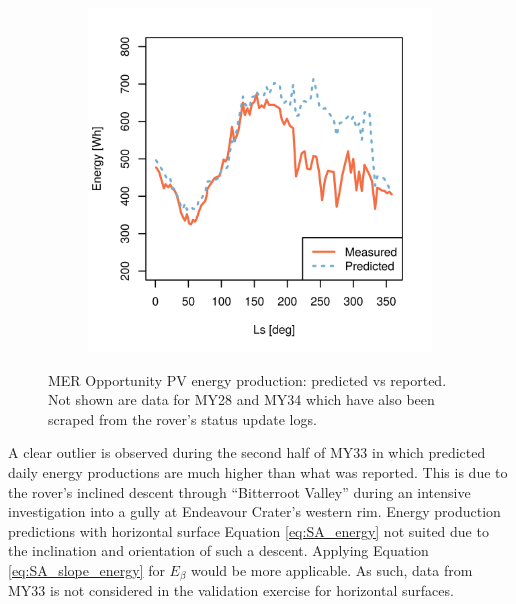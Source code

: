 \begin{figure}[h]
\begin{subfigure}[t]{\subfigureWidth}
  		\label{fig:plot:sub:mer-energy-production-predicted-vs-reported-my32}
  	\end{subfigure}\hfill
	   \begin{subfigure}[t]{\subfigureWidth}
      \centering
  		\includegraphics[height=\graphicsHeight]{sections/power-and-energy-predictions/plots/predicted-vs-measured-energy-my33.png}
  		\label{fig:plot:sub:mer-energy-production-predicted-vs-reported-my33}
	   \end{subfigure}\hfill
    \caption[MER Opportunity PV energy production: predicted vs reported]
            {MER Opportunity PV energy production: predicted vs reported. Not shown are data for MY28 and MY34 which have also been scraped from the rover's status update logs.}
	\label{fig:plot:mer-energy-production-predicted-vs-reported}
\vspace{-2ex}
\end{figure}

\clearpage

A clear outlier is observed during the second half of MY33 in which predicted daily energy productions are much higher than what was reported. This is due to the rover's inclined descent through ``Bitterroot Valley'' during an intensive investigation into a gully at Endeavour Crater's western rim. Energy production predictions with horizontal surface Equation \ref{eq:SA_energy} not suited due to the inclination and orientation of such a descent. Applying Equation \ref{eq:SA_slope_energy} for $E_{\beta}$ would be more applicable. As such, data from MY33 is not considered in the validation exercise for horizontal surfaces.

